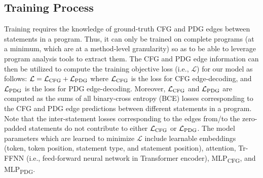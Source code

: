 \subsection{\bf Training Process}

Training \tool requires the knowledge of ground-truth CFG and PDG edges between statements in a program. Thus, it can only be trained on complete programs (at a minimum, which are at a method-level granularity) so as to be able to leverage program analysis tools to extract them. The CFG and PDG edge information can then be utilized to compute the training objective loss (i.e., $\mathcal{L}$) for our model as follows: $\mathcal{L} = \mathcal{L}\textsubscript{CFG} + \mathcal{L}\textsubscript{PDG}$
where $\mathcal{L}\textsubscript{CFG}$ is the loss for CFG edge-decoding, and $\mathcal{L}\textsubscript{PDG}$ is the loss for PDG edge-decoding. Moreover, $\mathcal{L}\textsubscript{CFG}$ and $\mathcal{L}\textsubscript{PDG}$ are computed as the sums of all binary-cross entropy (BCE) losses corresponding to the CFG and PDG edge predictions between different statements in a program. Note that the inter-statement losses corresponding to the edges from/to the zero-padded statements do not contribute to either $\mathcal{L}\textsubscript{CFG}$ or $\mathcal{L}\textsubscript{PDG}$. The model parameters which are learned to minimize $\mathcal{L}$ include learnable embeddings (token, token position, statement type, and statement position), attention, Tr-FFNN (i.e., feed-forward neural network in Transformer encoder), MLP\textsubscript{CFG}, and MLP\textsubscript{PDG}.


